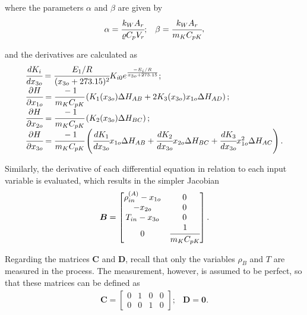 \documentclass[a4paper,11pt]{book}
\numberwithin{figure}{chapter}
\numberwithin{equation}{chapter}
\numberwithin{table}{chapter}
\theoremstyle{definition}
\begin{document}
\noindent where the parameters $\alpha$ and $\beta$ are given by
\begin{equation}
\begin{matrix}
	\alpha = \cfrac{k_W A_r}{\varrho C_p V_r}; & \beta = \cfrac{k_W A_r}{m_K C_{pK}}
\end{matrix}
,\end{equation}

\noindent and the derivatives are calculated as
\begin{equation}
\begin{matrix*}[l]
	\cfrac{d K_i}{d x_{3o}} = \cfrac{E_1/R}{(x_{3o} + 273.15)^2} K_{i0} e^{\frac{-E_i / R}{x_{3o} + 273.15}}; \\ 
	\cfrac{\partial H}{\partial x_{1o}} = \cfrac{-1}{m_K C_{pK}} \left( K_1(x_{3o}) \Delta H_{AB} + 2 K_3(x_{3o}) x_{1o} \Delta H_{AD} \right); \\ \cfrac{\partial H}{\partial x_{2o}} = \cfrac{-1}{m_K C_{pK}} \left( K_2(x_{3o}) \Delta H_{BC} \right); \\
	\cfrac{\partial H}{\partial x_{3o}} = \cfrac{-1}{m_K C_{pK}} \left( \cfrac{d K_1}{d x_{3o}} x_{1o} \Delta H_{AB} + \cfrac{d K_2}{d x_{3o}} x_{2o} \Delta H_{BC} + \cfrac{d K_3}{d x_{3o}} x^2_{1o} \Delta H_{AC} \right).
\end{matrix*}
\end{equation}

Similarly, the derivative of each differential equation in relation to each input variable is evaluated, which results in the simpler Jacobian
\begin{equation} \label{eq:exoLinSS02}
	\bm{B} = \begin{bmatrix}
		\rho^{(A)}_{in} - x_{1o} & 0 \\
		-x_{2o}			& 0 \\
		T_{in} - x_{3o}    & 0 \\
		0 			    & \cfrac{1}{m_K C_{pK}}
	\end{bmatrix}
.\end{equation} 

Regarding the matrices $\bm{C}$ and $\bm{D}$, recall that only the variables $\rho_B$ and $T$ are measured in the process. The measurement, however, is assumed to be perfect, so that these matrices can be defined as
\begin{equation} \label{eq:exoLinSS03}
\begin{matrix}
	\bm{C} = \begin{bmatrix}
		0 & 1 & 0 & 0 \\ 0 & 0 & 1 & 0
	\end{bmatrix}; & \bm{D} = \bm{0}.
\end{matrix}
\end{equation} 
\end{document}
